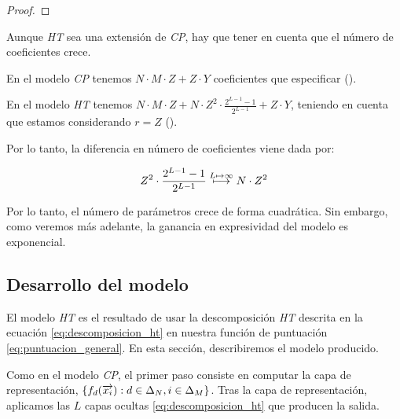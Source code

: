 \begin{proof}


\end{proof}

\begin{observacion}

    Aunque \textit{HT} sea una extensión de \textit{CP}, hay que tener en cuenta que el número de coeficientes crece.

    En el modelo \textit{CP} tenemos $N \cdot M \cdot Z + Z \cdot Y$ coeficientes que especificar ().

    En el modelo \textit{HT} tenemos $N \cdot M \cdot Z + N \cdot Z^2 \cdot \frac{2^{L-1} - 1}{2^{L-1}} + Z \cdot Y$, teniendo en cuenta que estamos considerando $r = Z$ ().

    Por lo tanto, la diferencia en número de coeficientes viene dada por:

    \begin{equation}
        Z^2 \cdot \frac{2^{L-1} - 1}{2^{L-1}} \stackrel{L \mapsto \infty}{\longmapsto} N \cdot Z^2
    \end{equation}

    Por lo tanto, el número de parámetros crece de forma cuadrática. Sin embargo, como veremos más adelante, la ganancia en expresividad del modelo es exponencial.

\end{observacion}

\subsection{Desarrollo del modelo}

El modelo \textit{HT} es el resultado de usar la descomposición \textit{HT} descrita en la ecuación \eqref{eq:descomposicion_ht} en nuestra función de puntuación \eqref{eq:puntuacion_general}. En esta sección, describiremos el modelo producido.

Como en el modelo \textit{CP}, el primer paso consiste en computar la capa de representación, $\{f_d(\overrightarrow{x_i}): d \in \Delta_{N}, i \in \Delta_{M}\}$. Tras la capa de representación, aplicamos las $L$ capas ocultas \eqref{eq:descomposicion_ht} que producen la salida.


